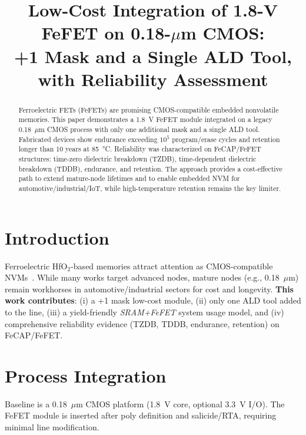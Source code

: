 \documentclass[conference]{IEEEtran}
\begin{document}
\title{Low-Cost Integration of 1.8-V FeFET on 0.18-$\mu$m CMOS:\\
+1 Mask and a Single ALD Tool, with Reliability Assessment}

\author{
}

\maketitle

\begin{abstract}
Ferroelectric FETs (FeFETs) are promising CMOS-compatible embedded nonvolatile memories.
This paper demonstrates a 1.8~V FeFET module integrated on a legacy 0.18~$\mu$m CMOS process with only one additional mask and a single ALD tool.
Fabricated devices show endurance exceeding $10^5$ program/erase cycles and retention longer than 10 years at \SI{85}{\celsius}.
Reliability was characterized on FeCAP/FeFET structures: time-zero dielectric breakdown (TZDB), time-dependent dielectric breakdown (TDDB), endurance, and retention.
The approach provides a cost-effective path to extend mature-node lifetimes and to enable embedded NVM for automotive/industrial/IoT, while high-temperature retention remains the key limiter.
\end{abstract}

\section{Introduction}
Ferroelectric HfO$_2$-based memories attract attention as CMOS-compatible NVMs~\cite{boscke2011,mueller2012,mikolajick2019,mueller2015}.
While many works target advanced nodes, mature nodes (e.g., 0.18~$\mu$m) remain workhorses in automotive/industrial sectors for cost and longevity.
\textbf{This work contributes}: (i) a +1 mask low-cost module, (ii) only one ALD tool added to the line, (iii) a yield-friendly \textit{SRAM+FeFET} system usage model, and (iv) comprehensive reliability evidence (TZDB, TDDB, endurance, retention) on FeCAP/FeFET.

\section{Process Integration}
Baseline is a 0.18~$\mu$m CMOS platform (1.8~V core, optional 3.3~V I/O).
The FeFET module is inserted after poly definition and salicide/RTA, requiring minimal line modification.
\end{document}
